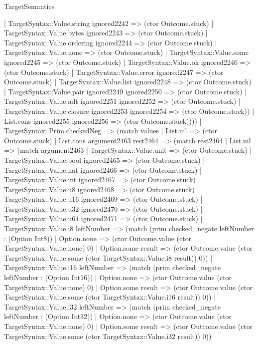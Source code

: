 \begin{lexlean}{TargetSemantics}
\begin{semanticmodule}
{            | TargetSyntax::Value.string ignored2242 => (ctor Outcome.stuck)
            | TargetSyntax::Value.bytes ignored2243 => (ctor Outcome.stuck)
            | TargetSyntax::Value.ordering ignored2244 => (ctor Outcome.stuck)
            | TargetSyntax::Value.none => (ctor Outcome.stuck)
            | TargetSyntax::Value.some ignored2245 => (ctor Outcome.stuck)
            | TargetSyntax::Value.ok ignored2246 => (ctor Outcome.stuck)
            | TargetSyntax::Value.error ignored2247 => (ctor Outcome.stuck)
            | TargetSyntax::Value.list ignored2248 => (ctor Outcome.stuck)
            | TargetSyntax::Value.pair ignored2249 ignored2250 => (ctor Outcome.stuck)
            | TargetSyntax::Value.adt ignored2251 ignored2252 => (ctor Outcome.stuck)
            | TargetSyntax::Value.closure ignored2253 ignored2254 => (ctor Outcome.stuck))
          | List.cons ignored2255 ignored2256 => (ctor Outcome.stuck))))
    | TargetSyntax::Prim.checkedNeg => (match values
      | List.nil => (ctor Outcome.stuck)
      | List.cons argument2463 rest2464 => (match rest2464
        | List.nil => (match argument2463
          | TargetSyntax::Value.unit => (ctor Outcome.stuck)
          | TargetSyntax::Value.bool ignored2465 => (ctor Outcome.stuck)
          | TargetSyntax::Value.nat ignored2466 => (ctor Outcome.stuck)
          | TargetSyntax::Value.int ignored2467 => (ctor Outcome.stuck)
          | TargetSyntax::Value.u8 ignored2468 => (ctor Outcome.stuck)
          | TargetSyntax::Value.u16 ignored2469 => (ctor Outcome.stuck)
          | TargetSyntax::Value.u32 ignored2470 => (ctor Outcome.stuck)
          | TargetSyntax::Value.u64 ignored2471 => (ctor Outcome.stuck)
          | TargetSyntax::Value.i8 leftNumber => (match (prim checked_negate leftNumber : (Option Int8))
            | Option.none => (ctor Outcome.value (ctor TargetSyntax::Value.none) 0)
            | Option.some result => (ctor Outcome.value (ctor TargetSyntax::Value.some (ctor TargetSyntax::Value.i8 result)) 0))
          | TargetSyntax::Value.i16 leftNumber => (match (prim checked_negate leftNumber : (Option Int16))
            | Option.none => (ctor Outcome.value (ctor TargetSyntax::Value.none) 0)
            | Option.some result => (ctor Outcome.value (ctor TargetSyntax::Value.some (ctor TargetSyntax::Value.i16 result)) 0))
          | TargetSyntax::Value.i32 leftNumber => (match (prim checked_negate leftNumber : (Option Int32))
            | Option.none => (ctor Outcome.value (ctor TargetSyntax::Value.none) 0)
            | Option.some result => (ctor Outcome.value (ctor TargetSyntax::Value.some (ctor TargetSyntax::Value.i32 result)) 0))
}
\end{semanticmodule}
\end{lexlean}
